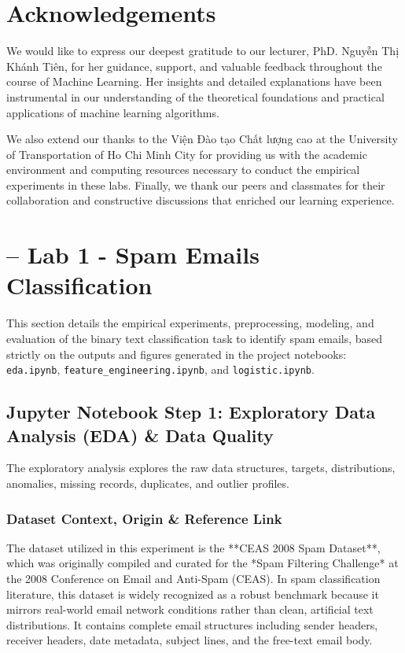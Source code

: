 \documentclass[12pt,a4paper]{article}
\begin{document}
\newpage
\section*{Acknowledgements}
We would like to express our deepest gratitude to our lecturer, PhD. Nguyễn Thị Khánh Tiên, for her guidance, support, and valuable feedback throughout the course of Machine Learning. Her insights and detailed explanations have been instrumental in our understanding of the theoretical foundations and practical applications of machine learning algorithms.

We also extend our thanks to the Viện Đào tạo Chất lượng cao at the University of Transportation of Ho Chi Minh City for providing us with the academic environment and computing resources necessary to conduct the empirical experiments in these labs. Finally, we thank our peers and classmates for their collaboration and constructive discussions that enriched our learning experience.

\newpage
\tableofcontents
\newpage
\listoffigures
\newpage
\listoftables
\newpage

\section{-- Lab 1 - Spam Emails Classification}

This section details the empirical experiments, preprocessing, modeling, and evaluation of the binary text classification task to identify spam emails, based strictly on the outputs and figures generated in the project notebooks: \texttt{eda.ipynb}, \texttt{feature\_engineering.ipynb}, and \texttt{logistic.ipynb}.

\subsection{Jupyter Notebook Step 1: Exploratory Data Analysis (EDA) \& Data Quality}
The exploratory analysis explores the raw data structures, targets, distributions, anomalies, missing records, duplicates, and outlier profiles.

\subsubsection{Dataset Context, Origin \& Reference Link}
The dataset utilized in this experiment is the **CEAS 2008 Spam Dataset**, which was originally compiled and curated for the *Spam Filtering Challenge* at the 2008 Conference on Email and Anti-Spam (CEAS). In spam classification literature, this dataset is widely recognized as a robust benchmark because it mirrors real-world email network conditions rather than clean, artificial text distributions. It contains complete email structures including sender headers, receiver headers, date metadata, subject lines, and the free-text email body.
\end{document}
